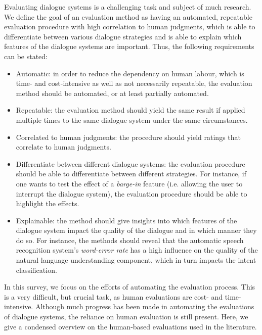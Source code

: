 Evaluating dialogue systems is a challenging task and subject of much research. We define the goal of an evaluation method as having an automated, repeatable evaluation procedure with high correlation to human judgments, which is able to differentiate between various dialogue strategies and is able to explain which features of the dialogue systems are important. Thus, the following requirements can be stated:
\begin{itemize}
\item Automatic: in order to reduce the dependency on human labour, which is time- and cost-intensive as well as not necessarily repeatable, the evaluation method should be automated, or at least partially automated. 
\item Repeatable: the evaluation method should yield the same result if applied multiple times to the same dialogue system under the same circumstances. 
\item Correlated to human judgments: the procedure should yield ratings that correlate to human judgments. 
\item Differentiate between different dialogue systems: the evaluation procedure should be able to differentiate between different strategies. For instance, if one wants to test the effect of a \emph{barge-in} feature (i.e. allowing the user to interrupt the dialogue system), the evaluation procedure should be able to highlight the effects. 
\item Explainable: the method should give insights into which features of the dialogue system impact the quality of the dialogue and in which manner they do so. For instance, the methods should reveal that the automatic speech recognition system's \emph{word-error rate} has a high influence on the quality of the natural language understanding component, which in turn impacts the intent classification. 
\end{itemize}
In this survey, we focus on the efforts of automating the evaluation process. This is a very difficult, but crucial task, as human evaluations are cost- and time-intensive. Although much progress has been made in automating the evaluations of dialogue systems, the reliance on human evaluation is still present. Here, we give a condensed overview on the human-based evaluations used in the literature.

